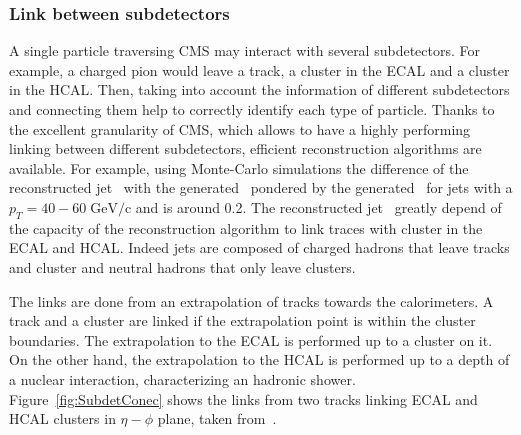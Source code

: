 \subsubsection{Link between subdetectors}

A single particle traversing CMS may interact with several subdetectors. For example, a charged pion would leave a track, a cluster in the ECAL and a cluster in the HCAL. Then, taking into account the information of different subdetectors and connecting them help to correctly identify each type of particle. Thanks to the excellent granularity of CMS, which allows to have a highly performing linking between different subdetectors, efficient reconstruction algorithms are available. For example, using Monte-Carlo simulations the difference of the reconstructed jet \pt~with the generated \pt~pondered by the generated \pt~for jets with a ${p_{T}=40-60\;\text{GeV/c}}$ and  is around 0.2. The reconstructed jet \pt~greatly depend of the capacity of the reconstruction algorithm to link traces with cluster in the ECAL and HCAL. Indeed jets are composed of charged hadrons that leave tracks and cluster and neutral hadrons that only leave clusters.

The links are done from an extrapolation of tracks towards the calorimeters. A track and a cluster are linked if the extrapolation point is within the cluster boundaries. The extrapolation to the ECAL is performed up to a cluster on it. On the other hand, the extrapolation to the HCAL is performed up to a  depth of a nuclear interaction, characterizing an hadronic shower. Figure~\ref{fig:SubdetConec} shows the links from two tracks linking ECAL and HCAL clusters in $\eta-\phi$ plane, taken from~\cite{Brochet:1956723}. %

